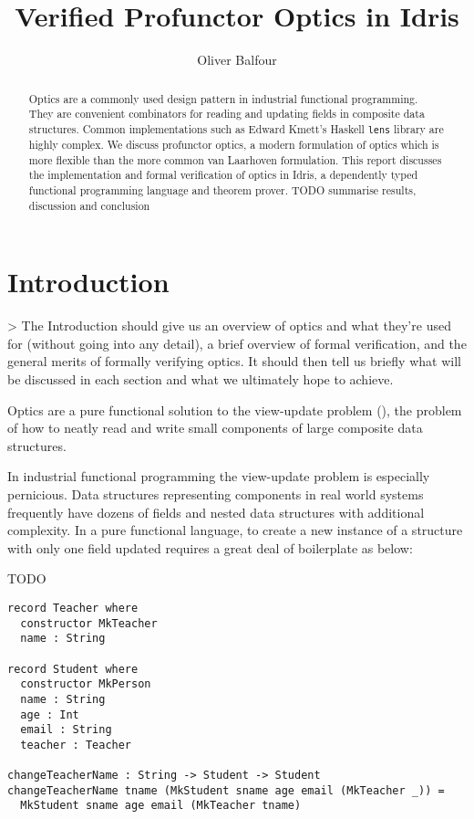 \documentclass[]{report}
\title{Verified Profunctor Optics in Idris}
\author{Oliver Balfour}
\begin{document}
\maketitle

\begin{abstract}
	Optics are a commonly used design pattern in industrial functional programming. They are convenient combinators for reading and updating fields in composite data structures. Common implementations such as Edward Kmett's Haskell \texttt{lens} library are highly complex. We discuss profunctor optics, a modern formulation of optics which is more flexible than the more common van Laarhoven formulation. This report discusses the implementation and formal verification of optics in Idris, a dependently typed functional programming language and theorem prover. TODO summarise results, discussion and conclusion
\end{abstract}

\tableofcontents
\newpage

\section{Introduction}

> The Introduction should give us an overview of optics and what they're used for (without going into any detail), a brief overview of formal verification, and the general merits of formally verifying optics. It should then tell us briefly what will be discussed in each section and what we ultimately hope to achieve.

Optics are a pure functional solution to the view-update problem (\cite{foster2005combinators}), the problem of how to neatly read and write small components of large composite data structures.

In industrial functional programming the view-update problem is especially pernicious. Data structures representing components in real world systems frequently have dozens of fields and nested data structures with additional complexity. In a pure functional language, to create a new instance of a structure with only one field updated requires a great deal of boilerplate as below:

TODO

\iffalse
\begin{verbatim}
record Teacher where
  constructor MkTeacher
  name : String

record Student where
  constructor MkPerson
  name : String
  age : Int
  email : String
  teacher : Teacher

changeTeacherName : String -> Student -> Student
changeTeacherName tname (MkStudent sname age email (MkTeacher _)) =
  MkStudent sname age email (MkTeacher tname)
\end{verbatim}
\end{document}
